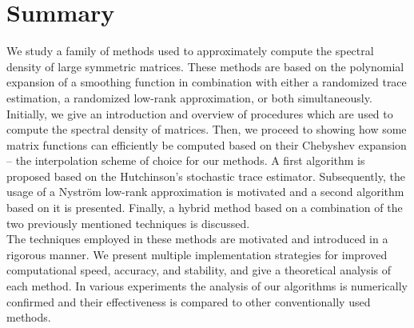 \chapter*{Summary}
\label{chp:0-summary}

We study a family of methods used to approximately compute the spectral density
of large symmetric matrices. These methods are based on the polynomial expansion
of a smoothing function in combination with either a randomized trace estimation,
a randomized low-rank approximation, or both simultaneously.\\

Initially, we give an introduction and overview of procedures which are used
to compute the spectral density of matrices. Then, we proceed to showing how
some matrix functions can efficiently be computed based on
their Chebyshev expansion -- the interpolation scheme of choice for our
methods. A first algorithm is proposed based on the Hutchinson's stochastic
trace estimator. Subsequently, the usage of a Nystr\"om low-rank approximation is
motivated and a second algorithm based on it is presented. Finally, a hybrid
method based on a combination of the two previously mentioned techniques is
discussed.\\

The techniques employed in these methods are motivated and introduced in a
rigorous manner. We present multiple implementation strategies for improved
computational speed, accuracy, and stability, and give a theoretical analysis
of each method. In various experiments the analysis of our algorithms is
numerically confirmed and their effectiveness is compared to other
conventionally used methods.
